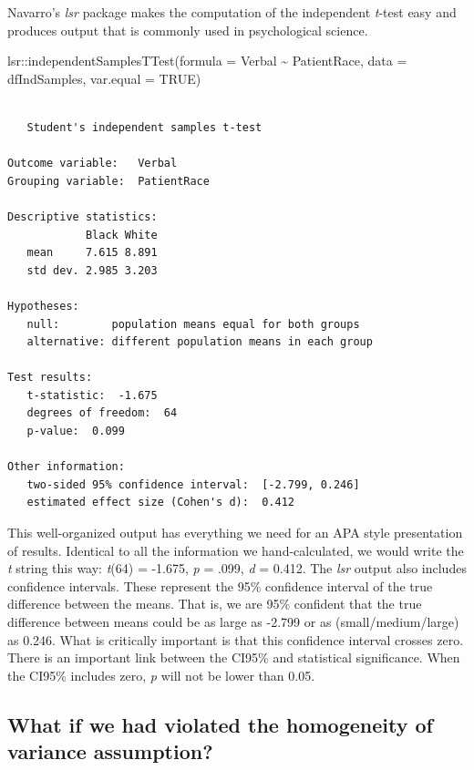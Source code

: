 \documentclass[
  11pt,
]{book}
\newenvironment{Shaded}{\begin{snugshade}}{\end{snugshade}}
\newcommand{\AttributeTok}[1]{\textcolor[rgb]{0.77,0.63,0.00}{#1}}
\newcommand{\ConstantTok}[1]{\textcolor[rgb]{0.00,0.00,0.00}{#1}}
\newcommand{\FunctionTok}[1]{\textcolor[rgb]{0.00,0.00,0.00}{#1}}
\newcommand{\NormalTok}[1]{#1}
\newcommand{\SpecialCharTok}[1]{\textcolor[rgb]{0.00,0.00,0.00}{#1}}
\begin{document}
Navarro's \emph{lsr} package makes the computation of the independent \emph{t}-test easy and produces output that is commonly used in psychological science.

\begin{Shaded}
\begin{Highlighting}[]
\NormalTok{lsr}\SpecialCharTok{::}\FunctionTok{independentSamplesTTest}\NormalTok{(}\AttributeTok{formula =}\NormalTok{ Verbal }\SpecialCharTok{\textasciitilde{}}\NormalTok{ PatientRace, }\AttributeTok{data =}\NormalTok{ dfIndSamples,}
    \AttributeTok{var.equal =} \ConstantTok{TRUE}\NormalTok{)}
\end{Highlighting}
\end{Shaded}

\begin{verbatim}

   Student's independent samples t-test 

Outcome variable:   Verbal 
Grouping variable:  PatientRace 

Descriptive statistics: 
            Black White
   mean     7.615 8.891
   std dev. 2.985 3.203

Hypotheses: 
   null:        population means equal for both groups
   alternative: different population means in each group

Test results: 
   t-statistic:  -1.675 
   degrees of freedom:  64 
   p-value:  0.099 

Other information: 
   two-sided 95% confidence interval:  [-2.799, 0.246] 
   estimated effect size (Cohen's d):  0.412 
\end{verbatim}

This well-organized output has everything we need for an APA style presentation of results. Identical to all the information we hand-calculated, we would write the \emph{t} string this way: \emph{t}(64) = -1.675, \emph{p} = .099, \emph{d} = 0.412. The \emph{lsr} output also includes confidence intervals. These represent the 95\% confidence interval of the true difference between the means. That is, we are 95\% confident that the true difference between means could be as large as -2.799 or as (small/medium/large) as 0.246. What is critically important is that this confidence interval crosses zero. There is an important link between the CI95\% and statistical significance. When the CI95\% includes zero, \emph{p} will not be lower than 0.05.

\hypertarget{what-if-we-had-violated-the-homogeneity-of-variance-assumption}{%
\subsection{What if we had violated the homogeneity of variance assumption?}\label{what-if-we-had-violated-the-homogeneity-of-variance-assumption}}
\end{document}
